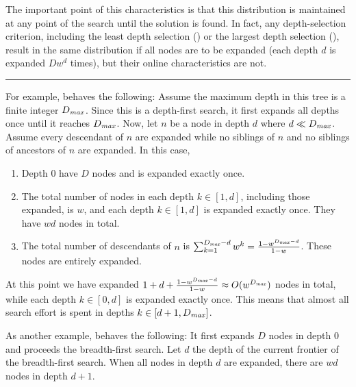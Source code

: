 The important point of this characteristics is that this distribution is maintained at any point of the search
until the solution is found. In fact, any depth-selection criterion, including the least depth selection (\fifo) or
the largest depth selection (\lifo), result in the same distribution if all nodes are to be expanded (each depth
$d$ is expanded $Dw^d$ times), but their online characteristics are not.
%

\hrule

For example, \lifo behaves the following: Assume the maximum depth in this tree is a finite integer
$D_{\mit{max}}$. Since this is a depth-first search, it first expands all depths once until it reaches
$D_{\mit{max}}$.
% 
% 
Now, let $n$ be a node in depth $d$ where $d\ll D_{\mit{max}}$.  Assume every descendant of $n$ are expanded
while no siblings of $n$ and no siblings of ancestors of $n$ are expanded.  In this case,
\begin{enumerate}
 \item Depth 0 have $D$ nodes and is expanded exactly once.
 \item The total number of nodes in each depth $k\in [1,d]$, including those expanded, is $w$, and each depth $k\in [1,d]$ is expanded exactly once. They have $wd$ nodes in total.
 \item The total number of descendants of $n$ is $\sum_{k=1}^{D_{\mit{max}}-d} w^k = \frac{1-w^{D_{\mit{max}}-d}}{1-w}$. These nodes are entirely expanded.
\end{enumerate}
At this point we have expanded $1+d+\frac{1-w^{D_{\mit{max}}-d}}{1-w} \approx O(w^{D_{\mit{max}}})$ nodes in total,
while each depth $k\in [0,d]$ is expanded exactly once.
This means that almost all search effort is spent in depths $k\in [d+1,D_{\mit{max}}]$.

As another example, \fifo behaves the following: It first expands $D$ nodes in depth 0 and proceeds the
breadth-first search. Let $d$ the depth of the current frontier of the breadth-first search. When all nodes in
depth $d$ are expanded, there are $wd$ nodes in depth $d+1$.
